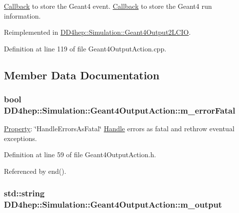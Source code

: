 \hyperlink{class_d_d4hep_1_1_callback}{Callback} to store the Geant4 event. \hyperlink{class_d_d4hep_1_1_callback}{Callback} to store the Geant4 run information. 

Reimplemented in \hyperlink{class_d_d4hep_1_1_simulation_1_1_geant4_output2_l_c_i_o_a0fa2240decba857840eed494d6349f5f}{DD4hep::Simulation::Geant4Output2LCIO}.

Definition at line 119 of file Geant4OutputAction.cpp.

\subsection{Member Data Documentation}
\hypertarget{class_d_d4hep_1_1_simulation_1_1_geant4_output_action_a7d76cce37c53f07c27f41a887fc05dbe}{
\subsubsection[{m\_\-errorFatal}]{\setlength{\rightskip}{0pt plus 5cm}bool {\bf DD4hep::Simulation::Geant4OutputAction::m\_\-errorFatal}}}
\label{class_d_d4hep_1_1_simulation_1_1_geant4_output_action_a7d76cce37c53f07c27f41a887fc05dbe}


\hyperlink{class_d_d4hep_1_1_property}{Property}: \char`\"{}HandleErrorsAsFatal\char`\"{} \hyperlink{class_d_d4hep_1_1_handle}{Handle} errors as fatal and rethrow eventual exceptions. 

Definition at line 59 of file Geant4OutputAction.h.

Referenced by end().\hypertarget{class_d_d4hep_1_1_simulation_1_1_geant4_output_action_ac3bd42351cc01a0e259cb5cc9641c6f4}{
\subsubsection[{m\_\-output}]{\setlength{\rightskip}{0pt plus 5cm}std::string {\bf DD4hep::Simulation::Geant4OutputAction::m\_\-output}}}
\label{class_d_d4hep_1_1_simulation_1_1_geant4_output_action_ac3bd42351cc01a0e259cb5cc9641c6f4}


